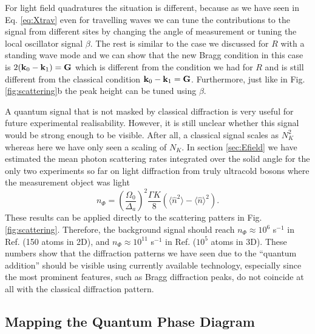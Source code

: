For light field quadratures the situation is different, because as we
have seen in Eq. \eqref{eq:Xtrav} even for travelling waves we can
tune the contributions to the signal from different sites by changing
the angle of measurement or tuning the local oscillator signal
$\beta$. The rest is similar to the case we discussed for $R$ with a
standing wave mode and we can show that the new Bragg condition in
this case is $2 (\mathbf{k}_0 - \mathbf{k}_1) = \mathbf{G}$ which is different from
the condition we had for $R$ and is still different from the classical
condition $\mathbf{k}_0 - \mathbf{k}_1 = \mathbf{G}$. Furthermore, just like in
Fig. \ref{fig:scattering}b the peak height can be tuned using $\beta$.

A quantum signal that is not masked by classical diffraction is very
useful for future experimental realisability. However, it is still
unclear whether this signal would be strong enough to be
visible. After all, a classical signal scales as $N_K^2$ whereas here
we have only seen a scaling of $N_K$. In section \ref{sec:Efield} we
have estimated the mean photon scattering rates integrated over the
solid angle for the only two experiments so far on light diffraction
from truly ultracold bosons where the measurement object was light
\begin{equation} 
  n_{\Phi}= \left(\frac{\Omega_0}{\Delta_a}\right)^2 \frac{\Gamma K}{8}
  (\langle\hat{n}^2\rangle-\langle\hat{n}\rangle^2).
\end{equation} 
These results can be applied directly to the scattering patters in
Fig. \ref{fig:scattering}. Therefore, the background signal should
reach $n_\Phi \approx 10^6$ s$^{-1}$ in Ref. \cite{weitenberg2011}
(150 atoms in 2D), and $n_\Phi \approx 10^{11}$ s$^{-1}$ in
Ref. \cite{miyake2011} ($10^5$ atoms in 3D). These numbers show that
the diffraction patterns we have seen due to the ``quantum addition''
should be visible using currently available technology, especially
since the most prominent features, such as Bragg diffraction peaks, do
not coincide at all with the classical diffraction pattern.

\subsection{Mapping the Quantum Phase Diagram}

